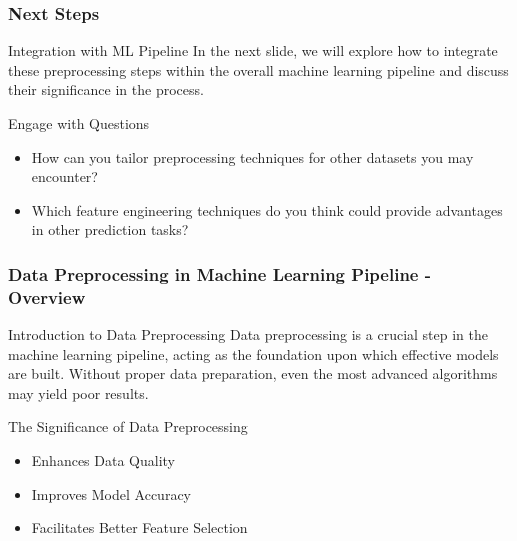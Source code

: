 \documentclass[aspectratio=169]{beamer}
\begin{document}
\begin{frame}[fragile]
    \frametitle{Next Steps}
    \begin{block}{Integration with ML Pipeline}
        In the next slide, we will explore how to integrate these preprocessing steps within the overall machine learning pipeline and discuss their significance in the process.
    \end{block}

    \begin{block}{Engage with Questions}
        \begin{itemize}
            \item How can you tailor preprocessing techniques for other datasets you may encounter?
            \item Which feature engineering techniques do you think could provide advantages in other prediction tasks?
        \end{itemize}
    \end{block}
\end{frame}

\begin{frame}[fragile]
    \frametitle{Data Preprocessing in Machine Learning Pipeline - Overview}
    \begin{block}{Introduction to Data Preprocessing}
        Data preprocessing is a crucial step in the machine learning pipeline, acting as the foundation upon which effective models are built. Without proper data preparation, even the most advanced algorithms may yield poor results.
    \end{block}
    
    \begin{block}{The Significance of Data Preprocessing}
        \begin{itemize}
            \item Enhances Data Quality
            \item Improves Model Accuracy
            \item Facilitates Better Feature Selection
        \end{itemize}
    \end{block}
\end{frame}
\end{document}
